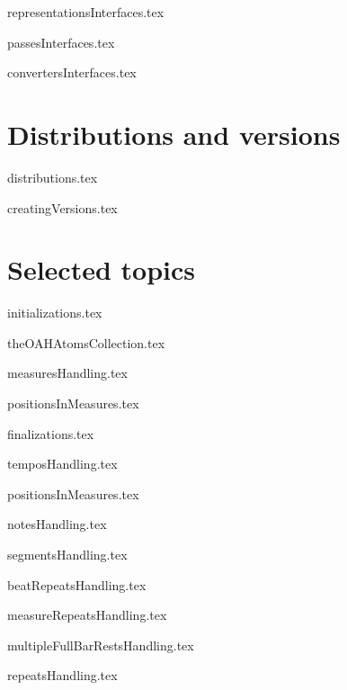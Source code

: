 \documentclass[11pt,a4paper]{report}
\begin{document}
{representationsInterfaces.tex}

{passesInterfaces.tex}

{convertersInterfaces.tex}


\part{Distributions and versions}

{distributions.tex}

{creatingVersions.tex}


\part{Selected topics}


{initializations.tex}



{theOAHAtomsCollection.tex}



{measuresHandling.tex}

{positionsInMeasures.tex}

{finalizations.tex}

{temposHandling.tex}

{positionsInMeasures.tex}

{notesHandling.tex}

{segmentsHandling.tex}

{beatRepeatsHandling.tex}

{measureRepeatsHandling.tex}

{multipleFullBarRestsHandling.tex}

{repeatsHandling.tex}
\end{document}

